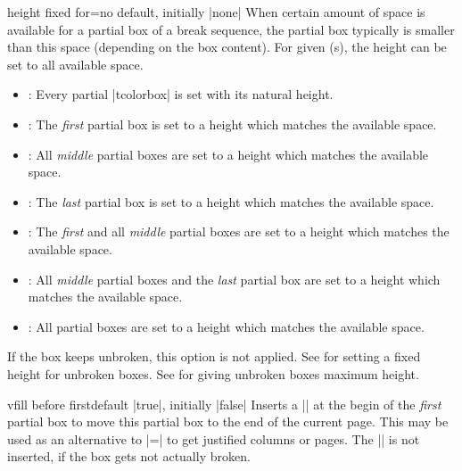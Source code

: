 \begin{docTcbKey}{height fixed for}{=}{no default, initially |none|}
  When certain amount of space is available for a partial box of a
  break sequence, the partial box typically is smaller than this space
  (depending on the box content). For given (s), the height can be
  set to all available space.
  \begin{itemize}
  \item{}: Every partial |tcolorbox| is set with its natural height.
  \item{}: The \emph{first} partial box is set to a height which matches the available space.
  \item{}: All \emph{middle} partial boxes are set to a height which matches the available space.
  \item{}: The \emph{last} partial box is set to a height which matches
    the available space.
  \item{}: The \emph{first} and
    all \emph{middle} partial boxes are set to a height which matches the available space.
  \item{}: All \emph{middle} partial boxes and the \emph{last} partial box
    are set to a height which matches the available space.
  \item{}: All partial boxes are set to a height which matches the available space.
  \end{itemize}
\begin{marker}
  If the box keeps unbroken, this option is not applied.
  See  for setting a fixed height for unbroken boxes.
  See  for giving unbroken boxes maximum height.
\end{marker}
\end{docTcbKey}


\begin{docTcbKey}{vfill before first}{}{default |true|, initially |false|}
  Inserts a |\vfill| at the begin of the \emph{first} partial box to move this
  partial box to the end of the current page. This may be used as an alternative
  to |=| to get justified
  columns or pages. The |\vfill| is not inserted, if the box gets not
  actually broken.
\end{docTcbKey}


